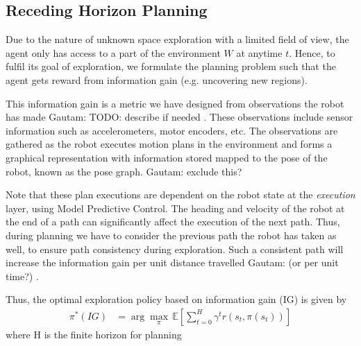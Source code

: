 \documentclass[letterpaper]{article} %
\newcommand{\ncomment}[1]{}
\newcommand{\gautam}[1]{{\color{cyan}Gautam: #1 }}
\begin{document}


\subsection{Receding Horizon Planning}

Due to the nature of unknown space exploration with a limited field of view, the agent \ncomment{decision making} only has access to a part of the environment $W$ at anytime $t$. Hence, to fulfil its goal of exploration, we formulate the planning problem such that the agent gets reward from information gain (e.g. uncovering new regions).

This information gain is a metric we have designed \ncomment{learned?} from observations the robot has made \gautam{TODO: describe if needed}. These observations include sensor information such as accelerometers, motor encoders, \ncomment{images?} etc. The observations are gathered as the robot executes motion plans in the environment and forms a graphical representation with information stored mapped to the pose of the robot, known as the pose graph. \gautam{exclude this?}

Note that these plan executions are dependent on the robot state at the \textit{execution} layer, using Model Predictive Control. The heading and velocity of the robot at the end of a path can significantly affect the execution of the next path. Thus, during planning we have to consider the previous path the robot has taken as well, to ensure path consistency during exploration. Such a consistent path will increase the information gain per unit distance travelled \gautam{(or per unit time?)}.

Thus, the optimal exploration policy based on information gain (IG) is given by
\begin{align}
  \pi^*(IG) &= \arg\max_\pi \, \mathbb{E} \left[ \sum_{t=0}^{H} \gamma^t r(s_t, \pi(s_t)) \right]
  \label{eq:ig_policy}
\end{align}
where H is the finite horizon for planning
\end{document}
